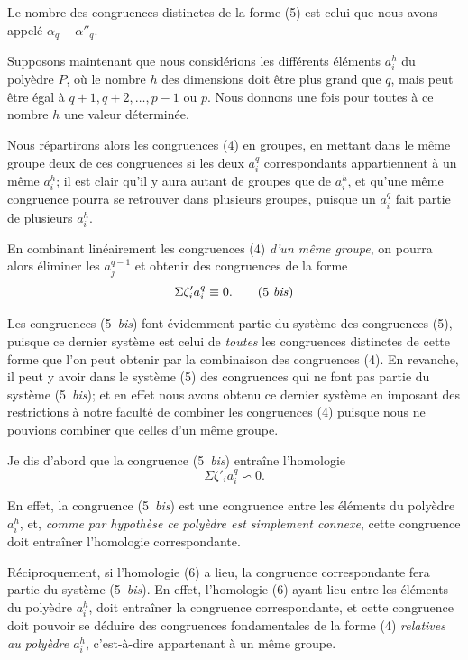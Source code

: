 \documentclass{article}
\begin{document}
Le nombre des congruences distinctes de la forme (5) est celui que nous avons appelé $\alpha_{q} - \alpha''_{q}$.

Supposons maintenant que nous considérions les différents éléments $a^{h}_{i}$ du polyèdre $P$, où le nombre $h$ des dimensions doit être plus grand que $q$, mais peut être égal à $q+1, q+2, \ldots, p-1$ ou $p$. Nous donnons une fois pour toutes à ce nombre $h$ une valeur déterminée.

Nous répartirons alors les congruences (4) en groupes, en mettant dans le même groupe deux de ces congruences si les deux $a^{q}_{i}$ correspondants appartiennent à un même $a^{h}_{i}$; il est clair qu'il y aura autant de groupes que de $a^{h}_{i}$, et qu'une même congruence pourra se retrouver dans plusieurs groupes, puisque un $a^{q}_{i}$ fait partie de plusieurs $a^{h}_{i}$.

En combinant linéairement les congruences (4) \emph{d'un même groupe}, on pourra alors éliminer les $a^{q-1}_{j}$ et obtenir des congruences de la forme
\[ \Sigma \zeta'_{i} a^{q}_{i} \equiv 0. \tag{5 \textit{bis}} \]

Les congruences (5~\emph{bis}) font évidemment partie du système des congruences (5), puisque ce dernier système est celui de \emph{toutes} les congruences distinctes de cette forme que l'on peut obtenir par la combinaison des congruences (4). En revanche, il peut y avoir dans le système (5) des congruences qui ne font pas partie du système (5~\emph{bis}); et en effet nous avons obtenu ce dernier système en imposant des restrictions à notre faculté de combiner les congruences (4) puisque nous ne pouvions combiner que celles d'un même groupe.

Je dis d'abord que la congruence (5~\emph{bis}) entraîne l'homologie
\[ \Sigma \zeta'_{i} a^{q}_{i} \backsim 0. \tag{6} \]

En effet, la congruence (5~\emph{bis}) est une congruence entre les éléments du polyèdre $a^{h}_{i}$, et, \emph{comme par hypothèse ce polyèdre est simplement connexe}, cette congruence doit entraîner l'homologie correspondante.

Réciproquement, si l'homologie (6) a lieu, la congruence correspondante fera partie du système (5~\emph{bis}). En effet, l'homologie (6) ayant lieu entre les éléments du polyèdre $a^{h}_{i}$, doit entraîner la congruence correspondante, et cette congruence doit pouvoir se déduire des congruences fondamentales de la forme (4) \emph{relatives au polyèdre $a^{h}_{i}$}, c'est-à-dire appartenant à un même groupe.
\end{document}
